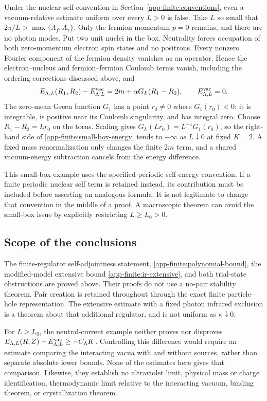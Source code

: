 Under the nuclear self convention in
Section~\ref{app-finite:conventions}, even a vacuum-relative estimate uniform
over every $L>0$ is false.  Take $L$ so small that
$2\pi/L>\max\{\Lambda_f,\Lambda_\gamma\}$.  Only the fermion momentum $p=0$
remains, and there are no photon modes.  Put two unit nuclei in the box.
Neutrality forces occupation of both zero-momentum electron spin states and
no positrons.  Every nonzero Fourier component of the fermion density
vanishes as an operator.  Hence the electron--nucleus and fermion--fermion
Coulomb terms vanish, including the ordering corrections discussed above,
and
\begin{equation}
 E_{\Lambda,L}(R_1,R_2)-E^{\rm vac}_{\Lambda,L}
 =2m+\alpha G_L(R_1-R_2),\qquad E^{\rm vac}_{\Lambda,L}=0.
 \label{app-finite:small-box-energy}
\end{equation}
The zero-mean Green function $G_1$ has a point $r_0\ne0$ where $G_1(r_0)<0$:
it is integrable, is positive near its Coulomb singularity, and has integral
zero.  Choose $R_1-R_2=Lr_0$ on the torus.  Scaling gives
$G_L(Lr_0)=L^{-1}G_1(r_0)$, so the right-hand side of
\eqref{app-finite:small-box-energy} tends to $-\infty$ as $L\downarrow0$ at
fixed $K=2$.  A fixed mass renormalization only changes the finite $2m$ term,
and a shared vacuum-energy subtraction cancels from the energy difference.

This small-box example uses the specified periodic self-energy convention.
If a finite periodic nuclear self term is retained instead, its contribution
must be included before asserting an analogous formula.  It is not legitimate
to change that convention in the middle of a proof.  A macroscopic theorem
can avoid the small-box issue by explicitly restricting $L\ge L_0>0$.

\subsection{Scope of the conclusions}
\label{app-finite:scope}

The finite-regulator self-adjointness statement,
\eqref{app-finite:polynomial-bound}, the modified-model extensive bound
\eqref{app-finite:ir-extensive}, and both trial-state obstructions are proved
above.  Their proofs do not use a no-pair stability theorem.  Pair creation is
retained throughout through the exact finite particle--hole representation.
The extensive estimate with a fixed photon infrared exclusion is a theorem
about that additional regulator, and is not uniform as $\kappa\downarrow0$.

For $L\ge L_0$, the neutral-current example neither proves nor disproves
$E_{\Lambda,L}(R,Z)-E^{\rm vac}_{\Lambda,L}\ge-C_\Lambda K$.
Controlling this difference would require an estimate comparing the
interacting vacua with and without sources, rather than separate absolute
lower bounds.  None of the estimates here gives that comparison.  Likewise,
they establish no ultraviolet limit, physical mass or charge identification,
thermodynamic limit relative to the interacting vacuum, binding theorem, or
crystallization theorem.
